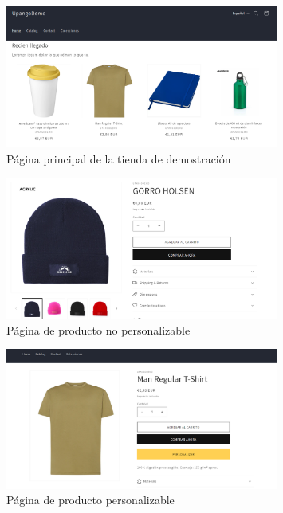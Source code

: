 \documentclass[12pt]{article}
\begin{document}
\begin{figure}[ht]
    \centering
    \includegraphics[width=0.8\textwidth]{imagenes/ManualUsuario/HomeTiendaDemo.png}
    \caption{\label{fig:HomeTiendaDemo}Página principal de la tienda de demostración}
    \vspace{\fill}
\end{figure}


\begin{figure}[ht]
    \centering
    \includegraphics[width=0.8\textwidth]{imagenes/ManualUsuario/PaginaProductoSinPersonalizacion.png}
    \caption{\label{fig:ProductoNoPersonalizable}Página de producto no personalizable}
    \vspace{\fill}
\end{figure}

\begin{figure}[ht]
    \centering
    \includegraphics[width=0.8\textwidth]{imagenes/ManualUsuario/PaginaProductoConPersonalizacion.png}
    \caption{\label{fig:ProductoPersonalizable}Página de producto personalizable}
    \vspace{\fill}
\end{figure}
\end{document}
